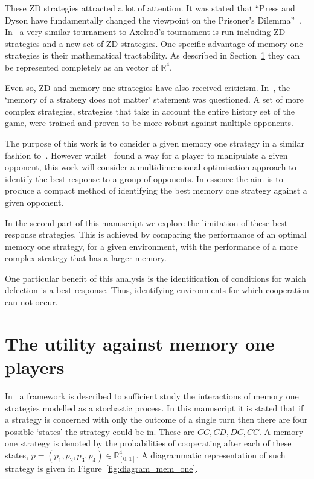 \documentclass[10pt]{article}
\newcommand{\R}{\mathbb{R}}
\begin{document}
These ZD strategies attracted a lot of attention. It was stated that ``Press and
Dyson have fundamentally changed the viewpoint on the Prisoner's
Dilemma''~\cite{Stewart2012}. In~\cite{Stewart2012} a very similar tournament to
Axelrod's tournament is run including ZD strategies and a new set of ZD
strategies. One specific advantage of memory one strategies is
their mathematical tractability.  As described in
Section~\ref{section:utility_against_mem_one} they can be represented completely
as an vector of \(\R^{4}\).

Even so, ZD and memory one strategies have also received criticism.
In~\cite{Harper2015},
the `memory of a strategy does not matter' statement was questioned. A set of more
complex strategies, strategies that take in account the entire history set of the
game, were trained and proven to be more robust against multiple opponents.

The purpose of this work is to consider a given memory one strategy in a similar
fashion to~\cite{Press2012}. However whilst~\cite{Press2012} found a way for a
player to manipulate a given opponent, this work will consider a
multidimensional optimisation approach to identify the best response to a group
of opponents. In essence the aim is to produce a compact method of identifying
the best memory one strategy against a given opponent.

In the second part of this manuscript we explore the limitation of these best response
strategies. This is achieved by comparing the performance of an optimal
memory one strategy, for a given environment, with the performance of a more complex
strategy that has a larger memory.

One particular benefit of this analysis is the identification of conditions for
which defection is a best response. Thus, identifying environments for which
cooperation can not occur.

\section{The utility against memory one players}\label{section:utility_against_mem_one}

In~\cite{Press2012} a framework is described to sufficient study the interactions
of memory one strategies modelled as a stochastic process. In this manuscript it
is stated that if a strategy is concerned with only the outcome of a single turn
then there are four possible `states' the strategy could be in. These are
\(CC, CD, DC,CC\). A memory one strategy is denoted by the probabilities of
cooperating after each of these states, \(p=(p_1, p_2, p_3, p_4) \in \R_{[0,1]} ^ 4\).
A diagrammatic representation of such strategy is given in Figure~\ref{fig:diagram_mem_one}.
\end{document}
